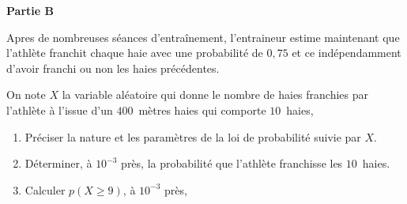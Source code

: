 \medskip

\textbf{Partie B}

\medskip

Apres de nombreuses séances d'entraînement, l'entraineur estime maintenant que l'athlète franchit chaque haie avec une probabilité de $0,75$ et ce indépendamment d'avoir franchi ou non les haies précédentes.

On note $X$ la variable aléatoire qui donne le nombre de haies franchies par l'athlète à l'issue d'un $400$~mètres haies qui comporte $10$~haies,

\medskip

\begin{enumerate}
\item Préciser la nature et les paramètres de la loi de probabilité suivie par $X$.
\item Déterminer, à $10^{-3}$ près, la probabilité que l'athlète franchisse les $10$~haies.
\item Calculer $p(X \geqslant 9)$, à $10^{-3}$ près,
\end{enumerate}

\bigskip
